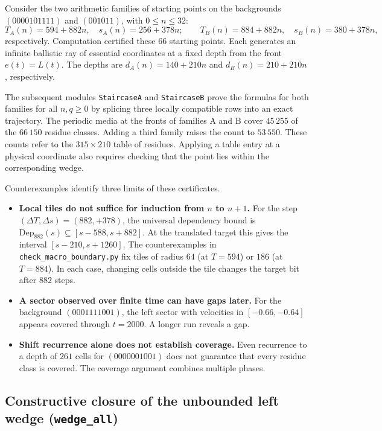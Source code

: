 Consider the two arithmetic families of starting points on the backgrounds $(0000101111)$ and $(001011)$, with $0 \le n \le 32$:
\begin{equation}
T_A(n) = 594 + 882n,\quad s_A(n) = 256 + 378n; \qquad
T_B(n) = 884 + 882n,\quad s_B(n) = 380 + 378n,
\end{equation}
respectively. Computation certified these $66$ starting points. Each generates an infinite ballistic ray of essential coordinates at a fixed depth from the front $e(t) = L(t)$. The depths are $d_A(n) = 140 + 210n$ and $d_B(n) = 210 + 210n$, respectively.

The subsequent modules \texttt{StaircaseA} and \texttt{StaircaseB} prove the formulas for both families for all $n,q\ge0$ by splicing three locally compatible rows into an exact trajectory. The periodic media at the fronts of families A and B cover $45\,255$ of the $66\,150$ residue classes. Adding a third family raises the count to $53\,550$. These counts refer to the $315\times210$ table of residues. Applying a table entry at a physical coordinate also requires checking that the point lies within the corresponding wedge.

Counterexamples identify three limits of these certificates.
\begin{itemize}
    \item \textbf{Local tiles do not suffice for induction from $n$ to $n+1$.} For the step $(\Delta T, \Delta s) = (882, +378)$, the universal dependency bound is $\mathrm{Dep}_{882}(s) \subseteq [s - 588, s + 882]$. At the translated target this gives the interval $[s - 210, s + 1260]$. The counterexamples in \texttt{check\_macro\_boundary.py} fix tiles of radius $64$ (at $T=594$) or $186$ (at $T=884$). In each case, changing cells outside the tile changes the target bit after $882$ steps.
    \item \textbf{A sector observed over finite time can have gaps later.} For the background $(0001111001)$, the left sector with velocities in $[-0.66, -0.64]$ appears covered through $t = 2000$. A longer run reveals a gap.
    \item \textbf{Shift recurrence alone does not establish coverage.} Even recurrence to a depth of $261$ cells for $(0000001001)$ does not guarantee that every residue class is covered. The coverage argument combines multiple phases.
\end{itemize}

\subsection{Constructive closure of the unbounded left wedge (\texttt{wedge\_all})}


